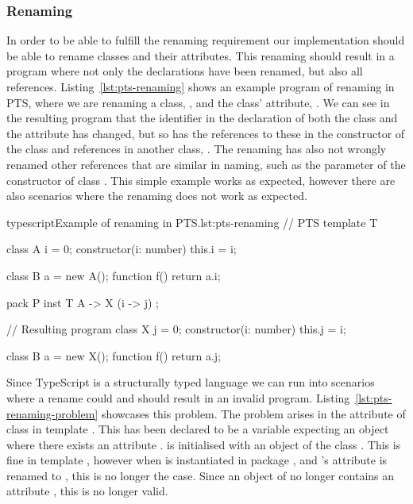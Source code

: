 \subsubsection{Renaming}\label{subsubsec:pts-renaming}

In order to be able to fulfill the renaming requirement our implementation should be able to rename classes and their attributes.
This renaming should result in a program where not only the declarations have been renamed, but also all references.
Listing~\vref{lst:pts-renaming} shows an example program of renaming in PTS, where we are renaming a class, , and the class' attribute, .
We can see in the resulting program that the identifier in the declaration of both the class and the attribute has changed, but so has the references to these in the constructor of the class and references in another class, \@.
The renaming has also not wrongly renamed other references that are similar in naming, such as the parameter of the constructor of class \@.
This simple example works as expected, however there are also scenarios where the renaming does not work as expected.

\begin{code}{typescript}{Example of renaming in PTS.}{lst:pts-renaming}
    // PTS
    template T {
        class A {
            i = 0;
            constructor(i: number) {
                this.i = i;
            }
        }

        class B {
            a = new A();
            function f() {
                return a.i;
            }
        }
    }

    pack P {
        inst T { A -> X (i -> j) };
    }

    // Resulting program
    class X {
        j = 0;
        constructor(i: number) {
            this.j = i;
        }
    }

    class B {
        a = new X();
        function f() {
            return a.j;
        }
    }
\end{code}

Since TypeScript is a structurally typed language we can run into scenarios where a rename could and should result in an invalid program.
Listing~\vref{lst:pts-renaming-problem} showcases this problem.
The problem arises in the  attribute of class  in template .
This has been declared to be a variable expecting an object where there exists an attribute .
 is initialised with an object of the class .
This is fine in template , however when  is instantiated in package , and 's attribute  is renamed to , this is no longer the case.
Since an object of  no longer contains an attribute , this is no longer valid.

